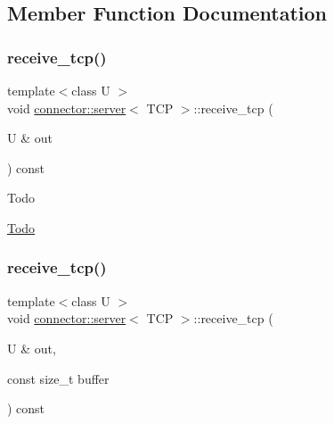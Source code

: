 \subsection{Member Function Documentation}
\mbox{\label{classconnector_1_1server_3_01TCP_01_4_a1e7fcee84fd01215a02cf78a958ca29b}} 
\subsubsection{\texorpdfstring{receive\+\_\+tcp()}{receive\_tcp()}\hspace{0.1cm}{\footnotesize\ttfamily [1/2]}}
{\footnotesize\ttfamily template$<$class U $>$ \\
void \hyperlink{classconnector_1_1server}{connector\+::server}$<$ T\+CP $>$\+::receive\+\_\+tcp (\begin{DoxyParamCaption}\item[{U \&}]{out }\end{DoxyParamCaption}) const\hspace{0.3cm}{\ttfamily [inline]}}

\begin{DoxyRefDesc}{Todo}
\item[\hyperlink{todo__todo000009}{Todo}]\end{DoxyRefDesc}
\mbox{\label{classconnector_1_1server_3_01TCP_01_4_a36ad727f7f1c4f017b7c2faab0ad6b8d}} 
\subsubsection{\texorpdfstring{receive\+\_\+tcp()}{receive\_tcp()}\hspace{0.1cm}{\footnotesize\ttfamily [2/2]}}
{\footnotesize\ttfamily template$<$class U $>$ \\
void \hyperlink{classconnector_1_1server}{connector\+::server}$<$ T\+CP $>$\+::receive\+\_\+tcp (\begin{DoxyParamCaption}\item[{U \&}]{out,  }\item[{const size\+\_\+t}]{buffer }\end{DoxyParamCaption}) const\hspace{0.3cm}{\ttfamily [inline]}}

